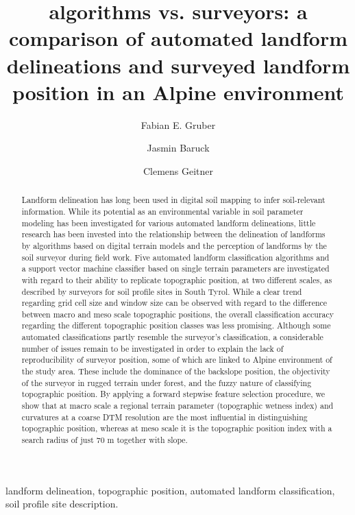 \documentclass[preprint,12pt,authoryear]{elsarticle}
\begin{document}
\begin{frontmatter}

\title{algorithms vs. surveyors: a comparison of automated landform delineations and surveyed landform position in an Alpine environment}


\author{Fabian E. Gruber}
\author{Jasmin Baruck}
\author{Clemens Geitner}

\address{University of Innsbruck}

\begin{abstract}
Landform delineation has long been used in digital soil mapping to infer soil-relevant information. While its potential as an environmental variable in soil parameter modeling has been investigated for various automated landform delineations, little research has been invested into the relationship between the delineation of landforms by algorithms based on digital terrain models and the perception of landforms by the soil surveyor during field work. Five automated landform classification algorithms and a support vector machine classifier based on single terrain parameters are investigated  with regard to their ability to replicate topographic position, at two different scales, as described by surveyors for soil profile sites in South Tyrol. While a clear trend regarding grid cell size and window size can be observed with regard to the difference between macro and meso scale topographic positions, the overall classification accuracy regarding the different topographic position classes was less promising. Although some automated classifications partly resemble the surveyor's classification, a considerable number of issues remain to be investigated in order to explain the lack of reproducibility of surveyor position, some of which are linked to Alpine environment of the study area.  These include the dominance of the backslope position, the objectivity of the surveyor in rugged terrain under forest, and the fuzzy nature of classifying topographic position. By applying a forward stepwise feature selection procedure, we show that at macro scale a regional terrain parameter (topographic wetness index) and curvatures at a coarse DTM resolution are the most influential in distinguishing topographic position, whereas at meso scale it is the topographic position index with a search radius of just 70 m together with slope.  
 
\end{abstract}

\begin{keyword}
landform delineation, topographic position, automated landform classification, soil profile site description.
\end{keyword}

\end{frontmatter}
\end{document}
